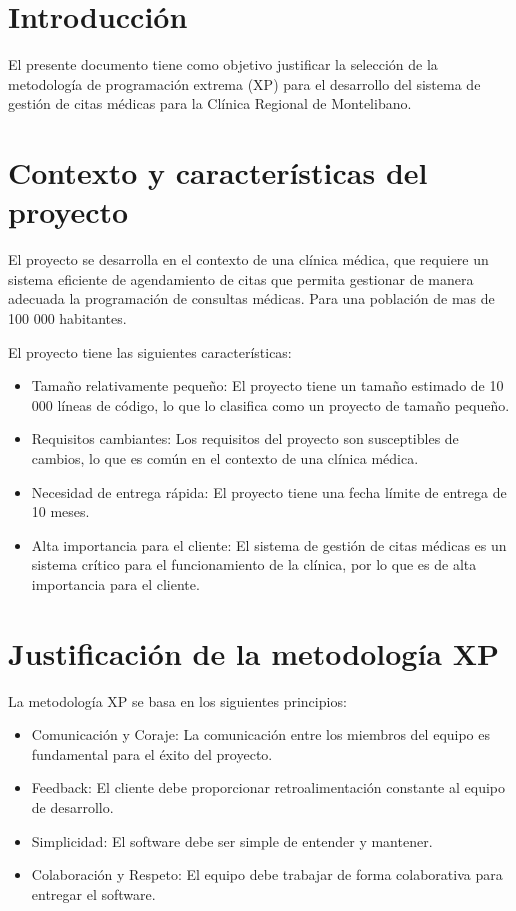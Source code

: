 \documentclass{article}
\theoremstyle{mytheoremstyle}
\theoremstyle{mytheoremstyle}
\theoremstyle{myproblemstyle}
\begin{document}
\section{Introducción}

El presente documento tiene como objetivo justificar la selección de la metodología de programación extrema (XP) para el desarrollo del sistema de gestión de citas médicas para la Clínica Regional de Montelibano.

\section{Contexto y características del proyecto}

El proyecto se desarrolla en el contexto de una clínica médica, que requiere un sistema eficiente de agendamiento de citas que permita gestionar de manera adecuada la programación de consultas médicas. Para una población de mas de 100 000 habitantes.

El proyecto tiene las siguientes características:
\begin{itemize}
    \item Tamaño relativamente pequeño: El proyecto tiene un tamaño estimado de 10 000 líneas de código, lo que lo clasifica como un proyecto de tamaño pequeño.
    \item Requisitos cambiantes: Los requisitos del proyecto son susceptibles de cambios, lo que es común en el contexto de una clínica médica.
    \item Necesidad de entrega rápida: El proyecto tiene una fecha límite de entrega de 10 meses.
    \item Alta importancia para el cliente: El sistema de gestión de citas médicas es un sistema crítico para el funcionamiento de la clínica, por lo que es de alta importancia para el cliente.
\end{itemize}

\section{Justificación de la metodología XP}

La metodología XP se basa en los siguientes principios:
\begin{itemize}
    \item Comunicación y Coraje: La comunicación entre los miembros del equipo es fundamental para el éxito del proyecto.
    \item Feedback: El cliente debe proporcionar retroalimentación constante al equipo de desarrollo.
    \item Simplicidad: El software debe ser simple de entender y mantener.
    \item Colaboración y Respeto: El equipo debe trabajar de forma colaborativa para entregar el software.

\end{itemize}
\end{document}
